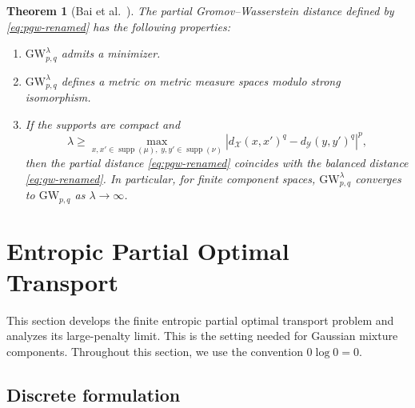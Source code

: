 \documentclass[a4paper,11pt]{article}
\numberwithin{equation}{section}
\newtheorem{thm}{Theorem}[section]
\DeclareMathOperator{\supp}{supp}
\newcommand{\GW}{\mathrm{GW}}
\newcommand{\X}{\mathcal{X}}
\newcommand{\Y}{\mathcal{Y}}
\begin{document}
\begin{thm}[Bai et al.~\cite{Bai2025}]\label{thm:gw-lambda}
The partial Gromov--Wasserstein distance defined by \eqref{eq:pgw-renamed} has the following properties: 
\begin{enumerate}[label=\textup{(\roman*)}]
  \item $\GW^{\lambda}_{p,q}$ admits a minimizer.
  \item $\GW^{\lambda}_{p,q}$ defines a metric on metric measure spaces modulo strong isomorphism.
  \item If the supports are compact and
  \begin{equation*}
  \lambda \geq \max_{x,x' \in \supp(\mu),\;y,y' \in \supp(\nu)} |d_{\X}(x,x')^q-d_{\Y}(y,y')^q|^p,
\end{equation*}
then the partial distance \eqref{eq:pgw-renamed} coincides with the balanced distance \eqref{eq:gw-renamed}. In particular, for finite component spaces, $\GW^{\lambda}_{p,q}$ converges to $\GW_{p,q}$ as $\lambda \to \infty$.
\end{enumerate}
\end{thm}


\section{Entropic Partial Optimal Transport}\label{sec:epot}

This section develops the finite entropic partial optimal transport problem and analyzes its large-penalty limit. This is the setting needed for Gaussian mixture components. Throughout this section, we use the convention $0\log 0 = 0$.

\subsection{Discrete formulation}\label{subsec:epot-discrete}
\end{document}
